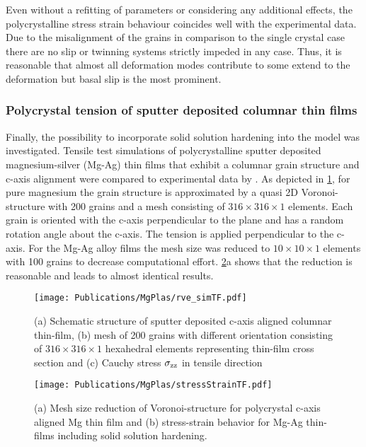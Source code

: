   Even without a refitting of parameters or considering any additional effects, the polycrystalline stress strain behaviour coincides well with the experimental data. Due to the misalignment of the grains in comparison to the single crystal case there are no slip or twinning systems strictly impeded in any case. Thus, it is reasonable that almost all deformation modes contribute to some extend to the deformation but basal slip is the most prominent.
  
  \subsubsection{Polycrystal tension of sputter deposited columnar thin films} %
  
  Finally, the possibility to incorporate solid solution hardening into the model was investigated. Tensile test simulations of polycrystalline sputter deposited magnesium-silver \mbox{(Mg-Ag)} thin films that exhibit a columnar grain structure and c-axis alignment were compared to experimental data by . As depicted in \cref{fig:voronoi}, for pure magnesium the grain structure is approximated by a quasi 2D Voronoi-structure with 200 grains and a mesh consisting of $316\times316\times1$ elements. Each grain is oriented with the c-axis perpendicular to the plane and has a random rotation angle about the c-axis. The tension is applied perpendicular to the c-axis. For the Mg-Ag alloy films the mesh size was reduced to $10\times10\times1$ elements with 100 grains to decrease computational effort. \cref{fig:voronoiAg}a shows that the reduction is reasonable and leads to almost identical results.
  
  
  \begin{figure}[!ht]
    \texttt{[image: Publications/MgPlas/rve\_simTF.pdf]}
    \caption{(a) Schematic structure of sputter deposited c-axis aligned columnar thin-film, (b) mesh of 200 grains with different orientation consisting of $316\times316\times1$ hexahedral elements representing thin-film cross section and (c) Cauchy stress $\sigma_{\rm zz}$ in tensile direction }
    \label{fig:voronoi}
  \end{figure}
  
  \begin{figure}[!ht]
    \centering
    \texttt{[image: Publications/MgPlas/stressStrainTF.pdf]}
    \caption{(a) Mesh size reduction of Voronoi-structure for polycrystal c-axis aligned Mg thin film and (b) stress-strain behavior for Mg-Ag thin-films including solid solution hardening.}
    \label{fig:voronoiAg}
  \end{figure}
  
